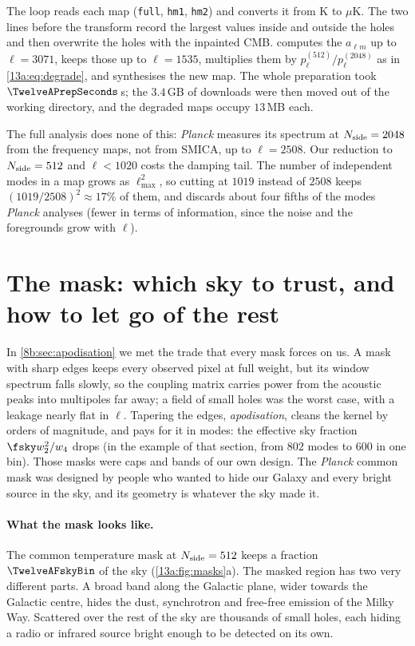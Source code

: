 \noindent The loop reads each map (\texttt{full}, \texttt{hm1}, \texttt{hm2}) and converts it from K to
$\mu$K. The two lines before the transform record the largest values inside and outside the holes and
then overwrite the holes with the inpainted CMB.  computes the $a_{\ell m}$ up to
$\ell=3071$,  keeps those up to $\ell=1535$,  multiplies them by
$p^{(512)}_\ell/p^{(2048)}_\ell$ as in \eqref{13a:eq:degrade}, and  synthesises the new map. The
whole preparation took $\TwelveAPrepSeconds$\,s; the $3.4$\,GB of downloads were then moved out of the
working directory, and the degraded maps occupy $13$\,MB each.

The full analysis does none of this: \textit{Planck} measures its spectrum at $N_{\rm side}=2048$ from the
frequency maps, not from SMICA, up to $\ell=2508$. Our reduction to $N_{\rm side}=512$ and $\ell<1020$ costs the
damping tail. The number of independent modes in a map grows as $\ell_{\max}^2$, so cutting at $1019$ instead of $2508$
keeps $(1019/2508)^2\approx17\%$ of them, and discards about four fifths of the modes \textit{Planck} analyses (fewer in
terms of information, since the noise and the foregrounds grow with $\ell$).
\section{The mask: which sky to trust, and how to let go of the rest}
\label{13a:sec:mask}

In \cref{8b:sec:apodisation} we met the trade that every mask forces on us. A mask with sharp edges keeps
every observed pixel at full weight, but its window spectrum falls slowly, so the coupling matrix carries
power from the acoustic peaks into multipoles far away; a field of small holes was the worst case, with a
leakage nearly flat in $\ell$. Tapering the edges, \emph{apodisation}, cleans the kernel by orders of
magnitude, and pays for it in modes: the effective sky fraction $\fsky w_2^2/w_4$ drops (in the example of
that section, from $802$ modes to $600$ in one bin). Those masks were caps and bands of our own design. The
\textit{Planck} common mask was designed by people who wanted to hide our Galaxy and every bright source
in the sky, and its geometry is whatever the sky made it.

\paragraph{What the mask looks like.} The common temperature mask at $N_{\rm side}=512$ keeps a fraction
$\TwelveAFskyBin$ of the sky (\cref{13a:fig:masks}a). The masked region has two very different parts. A broad
band along the Galactic plane, wider towards the Galactic centre, hides the dust, synchrotron and free-free
emission of the Milky Way. Scattered over the rest of the sky are thousands of small holes, each hiding a
radio or infrared source bright enough to be detected on its own.

